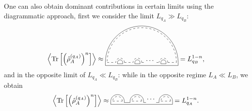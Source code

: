 \documentclass[aps,pra,reprint,superscriptaddress,twocolumn,notitlepage]{revtex4-1}
\newcommand{\Tr}{\text{Tr}}
\numberwithin{equation}{section}
\begin{document}
One can also obtain dominant contributions in certain limits using the diagrammatic approach, first we consider the limit $L_{q_A} \gg L_{q_B}$:
\begin{align}
    \left\langle \Tr \left[ \left( \hat\rho_{A}^{(q_A)} \right)^n \right] \right\rangle 
    \approx
    \tikz[scale=0.45,baseline=0.5ex]{
    \draw[dashed] (0,0) -- (1,0);
    \draw (-0.2,0.)-- (-0.2,-0.35);
    \draw (1.2,-0.15)-- (1.2,0.);
    \draw[dashed] (2,0) -- (3,0);
    \draw (1.8,0.)-- (1.8,-0.15);
    \draw (3.2,-0.15)-- (3.2,0.);
    \draw[dashed] (4,0) -- (4.35,0);
    \draw (3.8,0.)-- (3.8,-0.15);
    \draw[dashed] (7,0) -- (8,0);
    \draw[dashed] (5.7,0) -- (6,0);
    \draw (6.8,0.)-- (6.8,-0.15);
    \draw (6.2,0.)-- (6.2,-0.15);
    \draw (8.2,-0.35)-- (8.2,0.);
    \draw (1.2,-0.15)--(1.8,-0.15);
    \draw (3.2,-0.15)--(3.8,-0.15);
    \draw (6.2,-0.15)--(6.8,-0.15);
    \draw (-0.2,-0.35)-- (8.2,-0.35);
    \draw[dashed] (4.0,0) arc (0:180:0.5);
    \draw[dashed] (2.0,0) arc (0:180:0.5);
    \draw[dashed] (7,0) arc (0:180:0.5);
    \draw[dashed] (8,0) arc (0:180:4);
    \node[] at (5,0.2) {$\cdots$};
    \draw (3.8,0) arc (0:180:0.3);
    \draw (1.8,0) arc (0:180:0.3);
    \draw (6.8,0) arc (0:180:0.3);
    \draw (8.2,0) arc (0:180:4.2);
    }  
    = L_{q_B}^{1-n},
    \label{eq:LAgg_Renyi}
\end{align}
and in the opposite limit of $L_{q_A} \ll L_{q_B}$:
while in the opposite regime  $L_A \ll L_B$, we obtain
\begin{align}
    \left\langle \Tr \left[ \left( \hat\rho_{A}^{(q_A)} \right)^n \right] \right\rangle 
    \approx
    \tikz[scale=0.5,baseline=-0.5ex]{
    \draw[dashed] (0,0) -- (1,0);
    \draw (-0.2,0.)-- (-0.2,-0.35);
    \draw (1.2,-0.15)-- (1.2,0.);
    \draw[dashed] (2,0) -- (3,0);
    \draw (1.8,0.)-- (1.8,-0.15);
    \draw (3.2,-0.15)-- (3.2,0.);
    \draw[dashed] (5,0) -- (6,0);
    \draw (4.8,0.)-- (4.8,-0.15);
    \draw (6.2,-0.35)-- (6.2,0.);
    \draw (1.2,-0.15)--(1.8,-0.15);
    \draw (3.2,-0.15)--(3.45,-0.15);
    \draw (-0.2,-0.35)-- (6.2,-0.35);
    \draw (4.5,-0.15)--(4.8,-0.15);
    \node[] at (4.,0.2) {$\cdots$};
    \draw[dashed] (1.0,0) arc (0:180:0.5);
    \draw[dashed] (3.0,0) arc (0:180:0.5);
    \draw[dashed] (6,0) arc (0:180:0.5);
    \draw (1.2,0) arc (0:180:0.7);
    \draw (3.2,0) arc (0:180:0.7);
    \draw (6.2,0) arc (0:180:0.7);
    } 
    = L_{q_A}^{1-n}.
 \label{eq:LAll_Renyi}
\end{align}
\end{document}
